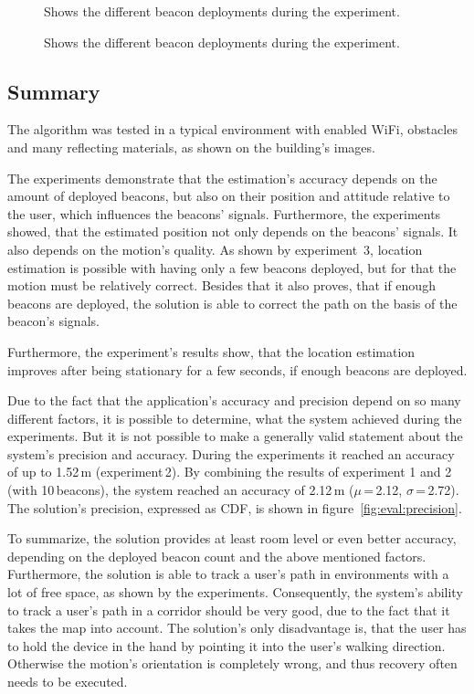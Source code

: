 \begin{figure}
	
	\caption{Shows the different beacon deployments during the experiment.}
	\label{fig:exp3_imgs}
\end{figure}

\begin{figure}
	
	\caption{Shows the different beacon deployments during the experiment.}
\end{figure}


\subsection*{Summary}
The algorithm was tested in a typical environment with enabled WiFi, obstacles and many reflecting materials, as shown on the building's images.

The experiments demonstrate that the estimation's accuracy depends on the amount of deployed beacons, but also on their position and attitude relative to the user, which influences the beacons' signals. Furthermore, the experiments showed, that the estimated position not only depends on the beacons' signals. It also depends on the motion's quality. As shown by experiment~3, location estimation is possible with having only a few beacons deployed, but for that the motion must be relatively correct. Besides that it also proves, that if enough beacons are deployed, the solution is able to correct the path on the basis of the beacon's signals.

Furthermore, the experiment's results show, that the location estimation improves after being stationary for a few seconds, if enough beacons are deployed.

Due to the fact that the application's accuracy and precision depend on so many different factors, it is possible to determine, what the system achieved during the experiments. But it is not possible to make a generally valid statement about the system's precision and accuracy. During the experiments it reached an accuracy of up to 1.52\,m (experiment\,2). By combining the results of experiment 1 and 2 (with 10\,beacons), the system reached an accuracy of 2.12\,m ($\mu$\,=\,2.12, $\sigma$\,=\,2.72). The solution's precision, expressed as \ac{CDF}, is shown in figure~\ref{fig:eval:precision}.

To summarize, the solution provides at least room level or even better accuracy, depending on the deployed beacon count and the above mentioned factors. Furthermore, the solution is able to track a user's path in environments with a lot of free space, as shown by the experiments. Consequently, the system's ability to track a user's path in a corridor should be very good, due to the fact that it takes  the map into account. The solution's only disadvantage is, that the user has to hold the device in the hand by pointing it into the user's walking direction. Otherwise the motion's orientation is completely wrong, and thus recovery often needs to be executed.


